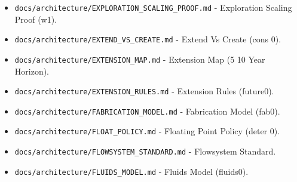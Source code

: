 \documentclass[9pt,a4paper,openany]{book}
\begin{document}
\begin{itemize}
\item \texttt{docs/\allowbreak{}architecture/\allowbreak{}EXPLORATION\_\allowbreak{}SCALING\_\allowbreak{}PROOF.\allowbreak{}md} -\allowbreak{} Exploration Scaling Proof (w1).\allowbreak{}
\end{itemize}

\begin{itemize}
\item \texttt{docs/\allowbreak{}architecture/\allowbreak{}EXTEND\_\allowbreak{}VS\_\allowbreak{}CREATE.\allowbreak{}md} -\allowbreak{} Extend Vs Create (cons 0).\allowbreak{}
\end{itemize}

\begin{itemize}
\item \texttt{docs/\allowbreak{}architecture/\allowbreak{}EXTENSION\_\allowbreak{}MAP.\allowbreak{}md} -\allowbreak{} Extension Map (5 10 Year Horizon).\allowbreak{}
\end{itemize}

\begin{itemize}
\item \texttt{docs/\allowbreak{}architecture/\allowbreak{}EXTENSION\_\allowbreak{}RULES.\allowbreak{}md} -\allowbreak{} Extension Rules (future0).\allowbreak{}
\end{itemize}

\begin{itemize}
\item \texttt{docs/\allowbreak{}architecture/\allowbreak{}FABRICATION\_\allowbreak{}MODEL.\allowbreak{}md} -\allowbreak{} Fabrication Model (fab0).\allowbreak{}
\end{itemize}

\begin{itemize}
\item \texttt{docs/\allowbreak{}architecture/\allowbreak{}FLOAT\_\allowbreak{}POLICY.\allowbreak{}md} -\allowbreak{} Floating Point Policy (deter 0).\allowbreak{}
\end{itemize}

\begin{itemize}
\item \texttt{docs/\allowbreak{}architecture/\allowbreak{}FLOWSYSTEM\_\allowbreak{}STANDARD.\allowbreak{}md} -\allowbreak{} Flowsystem Standard.\allowbreak{}
\end{itemize}

\begin{itemize}
\item \texttt{docs/\allowbreak{}architecture/\allowbreak{}FLUIDS\_\allowbreak{}MODEL.\allowbreak{}md} -\allowbreak{} Fluids Model (fluids0).\allowbreak{}
\end{itemize}
\end{document}
